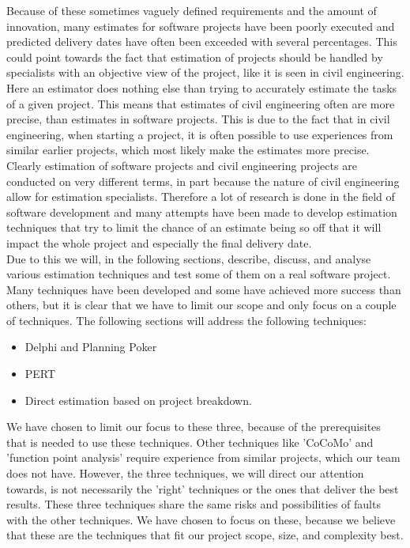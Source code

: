 Because of these sometimes vaguely defined requirements and the amount of innovation, many estimates for software projects have been poorly executed and predicted delivery dates have often been exceeded with several percentages. This could point towards the fact that estimation of projects should be handled by specialists with an objective view of the project, like it is seen in civil engineering. Here an estimator does nothing else than trying to accurately estimate the tasks of a given project\cite[p.140]{ProjectManagement_b}. This means that estimates of civil engineering often are more precise, than estimates in software projects. This is due to the fact that in civil engineering, when starting a project, it is often possible to use experiences from similar earlier projects, which most likely make the estimates more precise. \\
Clearly estimation of software projects and civil engineering projects are conducted on very different terms, in part because the nature of civil engineering allow for estimation specialists. Therefore a lot of research is done in the field of software development and many attempts have been made to develop estimation techniques that try to limit the chance of an estimate being so off that it will impact the whole project and especially the final delivery date. \\
Due to this we will, in the following sections, describe, discuss, and analyse various estimation techniques and test some of them on a real software project. Many techniques have been developed and some have achieved more success than others, but it is clear that we have to limit our scope and only focus on a couple of techniques. The following sections will address the following techniques:


\begin{itemize}
\item Delphi and Planning Poker 
\item PERT 
\item Direct estimation based on project breakdown.
\end{itemize}


We have chosen to limit our focus to these three, because of the prerequisites that is needed to use these techniques. Other techniques like 'CoCoMo' and 'function point analysis' require experience from similar projects, which our team does not have. However, the three techniques, we will direct our attention towards, is not necessarily the 'right' techniques or the ones that deliver the best results. These three techniques share the same risks and possibilities of faults with the other techniques. We have chosen to focus on these, because we believe that these are the techniques that fit our project scope, size, and complexity best.
\\



